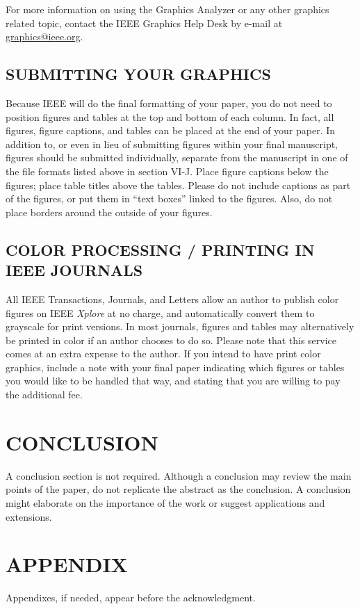 \documentclass{IEEEoj}
\begin{document}
For more information on using the Graphics Analyzer 
or any other graphics related topic, contact the IEEE Graphics Help Desk by 
e-mail at \underline {graphics@ieee.org}.

\subsection{SUBMITTING YOUR GRAPHICS}
Because IEEE will do the final formatting of your paper, 
you do not need to position figures and tables at the top and bottom of each 
column. In fact, all figures, figure captions, and tables can be placed at 
the end of your paper. In addition to, or even in lieu of submitting figures 
within your final manuscript, figures should be submitted individually, 
separate from the manuscript in one of the file formats listed above in 
section VI-J. Place figure captions below the figures; place table titles 
above the tables. Please do not include captions as part of the figures, or 
put them in ``text boxes'' linked to the figures. Also, do not place borders 
around the outside of your figures.

\subsection{COLOR PROCESSING / PRINTING IN IEEE JOURNALS}
All IEEE Transactions, Journals, and Letters allow an author to publish 
color figures on IEEE \textit{Xplore}{\textregistered} at no charge, and automatically 
convert them to grayscale for print versions. In most journals, figures and 
tables may alternatively be printed in color if an author chooses to do so. 
Please note that this service comes at an extra expense to the author. If 
you intend to have print color graphics, include a note with your final 
paper indicating which figures or tables you would like to be handled that 
way, and stating that you are willing to pay the additional fee.

\section{CONCLUSION}
A conclusion section is not required. Although a conclusion may review the 
main points of the paper, do not replicate the abstract as the conclusion. A 
conclusion might elaborate on the importance of the work or suggest 
applications and extensions.

\section*{APPENDIX}
Appendixes, if needed, appear before the acknowledgment.
\end{document}
